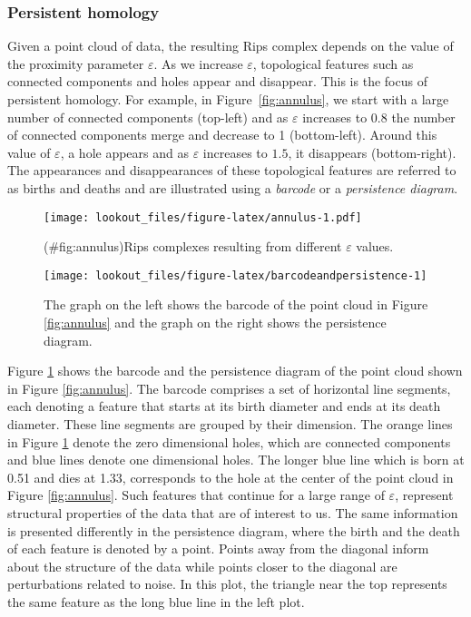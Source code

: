 \documentclass[
]{article}
\begin{document}
\hypertarget{persistent-homology}{%
\subsubsection*{Persistent homology}\label{persistent-homology}}

Given a point cloud of data, the resulting Rips complex depends on the
value of the proximity parameter \(\varepsilon\). As we increase
\(\varepsilon\), topological features such as connected components and
holes appear and disappear. This is the focus of persistent homology.
For example, in Figure~\ref{fig:annulus}, we start with a large number
of connected components (top-left) and as \(\varepsilon\) increases to
\(0.8\) the number of connected components merge and decrease to 1
(bottom-left). Around this value of \(\varepsilon\), a hole appears and
as \(\varepsilon\) increases to \(1.5\), it disappears (bottom-right).
The appearances and disappearances of these topological features are
referred to as births and deaths and are illustrated using a
\emph{barcode} or a \emph{persistence diagram}.

\begin{figure}
\centering
\texttt{[image: lookout\_files/figure-latex/annulus-1.pdf]}
\caption{(\#fig:annulus)Rips complexes resulting from different
\(\varepsilon\) values.}
\end{figure}

\begin{figure}
\texttt{[image: lookout\_files/figure-latex/barcodeandpersistence-1]} \caption{The graph on the left shows the barcode of the point cloud in Figure \ref{fig:annulus} and the graph on the right shows the persistence diagram.}\label{fig:barcodeandpersistence}
\end{figure}

Figure \ref{fig:barcodeandpersistence} shows the barcode and the
persistence diagram of the point cloud shown in Figure
\ref{fig:annulus}. The barcode comprises a set of horizontal line
segments, each denoting a feature that starts at its birth diameter and
ends at its death diameter. These line segments are grouped by their
dimension. The orange lines in Figure \ref{fig:barcodeandpersistence}
denote the zero dimensional holes, which are connected components and
blue lines denote one dimensional holes. The longer blue line which is
born at 0.51 and dies at 1.33, corresponds to the hole at the center of
the point cloud in Figure \ref{fig:annulus}. Such features that continue
for a large range of \(\varepsilon\), represent structural properties of
the data that are of interest to us. The same information is presented
differently in the persistence diagram, where the birth and the death of
each feature is denoted by a point. Points away from the diagonal inform
about the structure of the data while points closer to the diagonal are
perturbations related to noise. In this plot, the triangle near the top
represents the same feature as the long blue line in the left plot.
\end{document}
